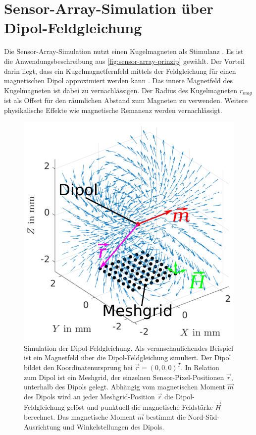 %

\section{Sensor-Array-Simulation über Dipol-Feldgleichung}\label{sec:sensor-array-simulation-dipol-feldgleichung}


Die Sensor-Array-Simulation nutzt einen Kugelmagneten als Stimulanz \cite{Schuethe2019}. Es ist die Anwendungsbeschreibung aus \autoref{fig:sensor-array-prinzip} gewählt. Der Vorteil darin liegt, dass ein Kugelmagnetfernfeld mittels der Feldgleichung für einen magnetischen Dipol approximiert werden kann \cite{Pape2017}. Das innere Magnetfeld des Kugelmagneten ist dabei zu vernachlässigen. Der Radius des Kugelmagneten $r_{mag}$ ist als Offset für den räumlichen Abstand zum Magneten zu verwenden. Weitere physikalische Effekte wie magnetische Remanenz werden vernachlässigt.



\begin{figure}[ph]
	\centering
	\includegraphics[width=0.7\linewidth]{chapters/images/2-Grundlagen/Dipol-Feldgleichung}
	\caption[Simulation der Dipol-Feldgleichung]{Simulation der Dipol-Feldgleichung. Als veranschaulichendes Beispiel ist ein Magnetfeld über die Dipol-Feldgleichung simuliert. Der Dipol bildet den Koordinatenursprung bei $\vec{r} = (0,0,0)^T$. In Relation zum Dipol ist ein Meshgrid, der einzelnen Sensor-Pixel-Positionen $\vec{r}$, unterhalb des Dipols gelegt. Abhängig vom magnetischen Moment $\vec{m}$ des Dipols wird an jeder Meshgrid-Position $\vec{r}$ die Dipol-Feldgleichung gelöst und punktuell die magnetische Feldstärke $\vec{H}$ berechnet. Das magnetische Moment $\vec{m}$ bestimmt die Nord-Süd-Ausrichtung und Winkelstellungen des Dipols.}
	\label{fig:dipol-feldgleichung}
\end{figure}


